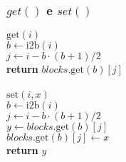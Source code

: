 \documentclass{beamer}
\begin{document}
\begin{frame}
\frametitle{$get()$ e $set()$}
\begin{oframed}
\begin{flushleft}
\hspace*{1em} \ensuremath{\mathrm{get}(\ensuremath{\mathit{i}})}\\

\hspace*{1em} \hspace*{1em} \ensuremath{\ensuremath{\mathit{b}} \gets  \ensuremath{\mathrm{i2b}(\ensuremath{\mathit{i}})}}\\
\hspace*{1em} \hspace*{1em} \ensuremath{\ensuremath{\mathit{j}} \gets  \ensuremath{\ensuremath{\mathit{i}} - \ensuremath{\mathit{b}}\cdot (\ensuremath{\mathit{b}}+1)/2}}\\
\hspace*{1em} \hspace*{1em} {\color{black} \textbf{return}} \ensuremath{\ensuremath{\mathit{blocks}}.\mathrm{get}(\ensuremath{\mathit{b}})[\ensuremath{\mathit{j}}]}\\
\ \\
\hspace*{1em} \ensuremath{\mathrm{set}(\ensuremath{\mathit{i}}, \ensuremath{\mathit{x}})}\\

\hspace*{1em} \hspace*{1em} \ensuremath{\ensuremath{\mathit{b}} \gets  \ensuremath{\mathrm{i2b}(\ensuremath{\mathit{i}})}}\\
\hspace*{1em} \hspace*{1em} \ensuremath{\ensuremath{\mathit{j}} \gets  \ensuremath{\ensuremath{\mathit{i}} - \ensuremath{\mathit{b}}\cdot (\ensuremath{\mathit{b}}+1)/2}}\\
\hspace*{1em} \hspace*{1em} \ensuremath{\ensuremath{\mathit{y}} \gets  \ensuremath{\ensuremath{\mathit{blocks}}.\mathrm{get}(\ensuremath{\mathit{b}})[\ensuremath{\mathit{j}}]}}\\
\hspace*{1em} \hspace*{1em} \ensuremath{\ensuremath{\mathit{blocks}}.\ensuremath{\mathrm{get}(\ensuremath{\mathit{b}})[\ensuremath{\mathit{j}}]} \gets  \ensuremath{x}}\\
\hspace*{1em} \hspace*{1em} {\color{black} \textbf{return}} \ensuremath{\ensuremath{\mathit{y}}}\\
\end{flushleft}
\end{oframed}
\end{frame}
\end{document}
